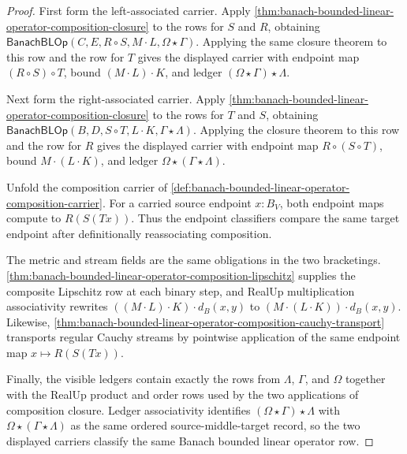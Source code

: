 \begin{proof}
First form the left-associated carrier. Apply
\autoref{thm:banach-bounded-linear-operator-composition-closure} to the rows
for $S$ and $R$, obtaining
$\mathsf{BanachBLOp}(C,E,R\circ S,M\cdot L,\Omega\star\Gamma)$. Applying the
same closure theorem to this row and the row for $T$ gives the displayed
carrier with endpoint map $(R\circ S)\circ T$, bound $(M\cdot L)\cdot K$, and
ledger $(\Omega\star\Gamma)\star\Lambda$.

Next form the right-associated carrier. Apply
\autoref{thm:banach-bounded-linear-operator-composition-closure} to the rows
for $T$ and $S$, obtaining
$\mathsf{BanachBLOp}(B,D,S\circ T,L\cdot K,\Gamma\star\Lambda)$. Applying the
closure theorem to this row and the row for $R$ gives the displayed carrier
with endpoint map $R\circ(S\circ T)$, bound $M\cdot(L\cdot K)$, and ledger
$\Omega\star(\Gamma\star\Lambda)$.

Unfold the composition carrier of
\autoref{def:banach-bounded-linear-operator-composition-carrier}. For a
carried source endpoint $x:B_V$, both endpoint maps compute to $R(S(Tx))$.
Thus the endpoint classifiers compare the same target endpoint after
definitionally reassociating composition.

The metric and stream fields are the same obligations in the two bracketings.
\autoref{thm:banach-bounded-linear-operator-composition-lipschitz} supplies
the composite Lipschitz row at each binary step, and RealUp multiplication
associativity rewrites $((M\cdot L)\cdot K)\cdot d_B(x,y)$ to
$(M\cdot(L\cdot K))\cdot d_B(x,y)$. Likewise,
\autoref{thm:banach-bounded-linear-operator-composition-cauchy-transport}
transports regular Cauchy streams by pointwise application of the same
endpoint map $x\mapsto R(S(Tx))$.

Finally, the visible ledgers contain exactly the rows from $\Lambda$,
$\Gamma$, and $\Omega$ together with the RealUp product and order rows used
by the two applications of composition closure. Ledger associativity
identifies $(\Omega\star\Gamma)\star\Lambda$ with
$\Omega\star(\Gamma\star\Lambda)$ as the same ordered source-middle-target
record, so the two displayed carriers classify the same Banach bounded linear
operator row.
\end{proof}

